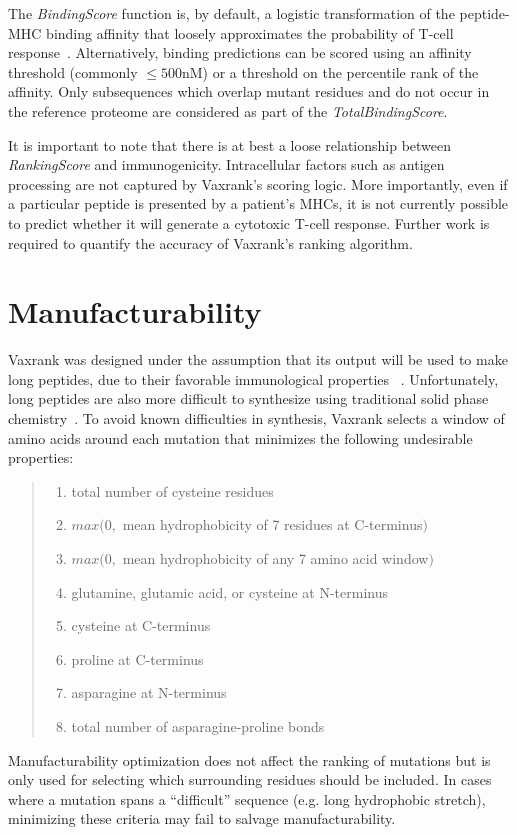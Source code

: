 \documentclass[10pt,letterpaper]{article}
\begin{document}
The {\it BindingScore} function is, by default, a logistic transformation of the peptide-MHC binding affinity that loosely approximates the probability of T-cell response~\citep{Sette1994}. Alternatively, binding predictions can be scored using an affinity threshold (commonly $\leq 500$nM) or a threshold on the percentile rank of the affinity. Only subsequences which overlap mutant residues and do not occur in the reference proteome are considered as part of the {\it TotalBindingScore}. 

It is important to note that there is at best a loose relationship between {\it RankingScore} and immunogenicity. Intracellular factors such as antigen processing are not captured by Vaxrank's scoring logic. More importantly, even if a particular peptide is presented by a patient's MHCs, it is not currently possible to predict whether it will generate a cytotoxic T-cell response. Further work is required to quantify the accuracy of Vaxrank's ranking algorithm. 

\section{Manufacturability}
Vaxrank was designed under the assumption that its output will be used to make long peptides, due to their favorable immunological properties ~\citep{synthetic-long-peptides}. Unfortunately, long peptides are also more difficult to synthesize using traditional solid phase chemistry~\citep{PeptideChemistry}. To avoid known difficulties in synthesis, Vaxrank selects a window of amino acids around each mutation that minimizes the following undesirable properties:

\begin{quote}
\begin{enumerate}
	\item total number of cysteine residues
	\item $max(0, $ mean hydrophobicity of 7 residues at C-terminus$)$
	\item $max(0, $ mean hydrophobicity of any 7 amino acid window$)$
	\item glutamine, glutamic acid, or cysteine at N-terminus
	\item cysteine at C-terminus
	\item proline at C-terminus
	\item asparagine at N-terminus
	\item total number of asparagine-proline bonds
\end{enumerate}
\end{quote}
Manufacturability optimization does not affect the ranking of mutations but is only used for selecting which surrounding residues should be included.  In cases where a mutation  spans a ``difficult'' sequence (e.g. long hydrophobic stretch), minimizing these criteria  may fail to salvage manufacturability.
\end{document}

